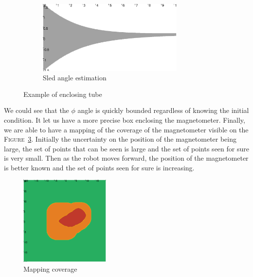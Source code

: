 \begin{figure}[!htb]
\begin{subfigure}{0.5\textwidth}
            \centering
            \includegraphics[width=0.8\textwidth]{imgs/example_phi.png}
            \caption{Sled angle estimation}
            \label{fig:phi}
            \hfill
        \end{subfigure}
        \caption{\label{fig:example_tube} Example of enclosing tube}
    \end{figure}
    \hfill

    We could see that the $\phi$ angle is quickly bounded regardless of knowing the initial condition. It let us have a more precise box enclosing the magnetometer. Finally, we are able to have a mapping of the coverage of the magnetometer visible on the \textsc{Figure}~\ref{fig:example_coverage}. Initially the uncertainty on the position of the magnetometer being large, the set of points that can be seen is large and the set of points seen for sure is very small. Then as the robot moves forward, the position of the magnetometer is better known and the set of points seen for sure is increasing.

    \begin{figure}[!htb]
        \centering
        \includegraphics[width=0.4\textwidth]{imgs/example_coverage.png}
        \caption{Mapping coverage}
        \label{fig:example_coverage}
    \end{figure}

